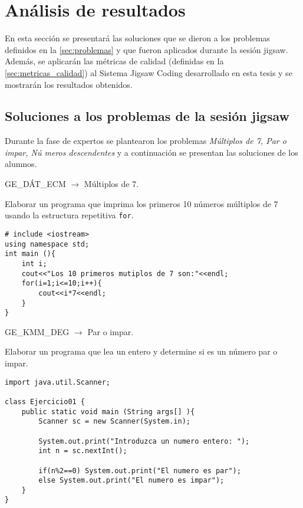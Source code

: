 \chapter{Análisis de resultados}
\label{cap:analisis_de_resultados}
En esta sección se presentará las soluciones que se dieron a los problemas definidos en la \autoref{sec:problemas} y que fueron aplicados durante la sesión jigsaw. Además, se aplicarán las métricas de calidad (definidas en la \autoref{sec:metricas_calidad}) al Sistema Jigsaw Coding desarrollado en esta tesis y se mostrarán los resultados obtenidos.\\

\section{Soluciones a los problemas de la sesión jigsaw}
Durante la fase de expertos se plantearon los problemas \emph{Múltiplos de 7, Par o impar, Nú meros descendentes} y a continuación se presentan las soluciones de los alumnos.

\begin{center}
	GE\_DÁT\_ECM $\longrightarrow$ Múltiplos de 7.
\end{center}

Elaborar un programa que imprima los primeros 10 números múltiplos de 7 usando la estructura repetitiva \texttt{for}.

\lstset{language=C, breaklines=true, basicstyle=\footnotesize}
\begin{lstlisting}
# include <iostream>
using namespace std;
int main (){
	int i;
	cout<<"Los 10 primeros mutiplos de 7 son:"<<endl;
	for(i=1;i<=10;i++){
		cout<<i*7<<endl;
	}
}
\end{lstlisting}
\clearpage
\begin{center}
	GE\_KMM\_DEG $\longrightarrow$ Par o impar.
\end{center}

Elaborar un programa que lea un entero y determine si es un número par o impar.

\lstset{language=Java, breaklines=true, basicstyle=\footnotesize}
\begin{lstlisting}
import java.util.Scanner;

class Ejercicio01 {
	public static void main (String args[] ){
		Scanner sc = new Scanner(System.in);

		System.out.print("Introduzca un numero entero: ");
		int n = sc.nextInt();

		if(n%2==0) System.out.print("El numero es par");
		else System.out.print("El numero es impar");
	}
}
\end{lstlisting}

